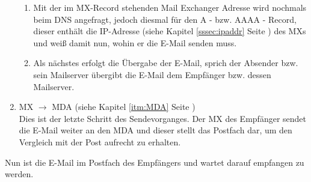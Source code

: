 \documentclass[12pt,a4paper]{report}
\begin{document}
\begin{onehalfspace}
\begin{enumerate}
\begin{enumerate}
\item Mit der im MX-Record stehenden Mail Exchanger Adresse wird nochmals beim DNS angefragt, jedoch diesmal für den A - bzw. AAAA - Record, dieser enthält die IP-Adresse (siehe Kapitel \ref{sssec:ipaddr} Seite \pageref{sssec:ipaddr}) des MXs und weiß damit nun, wohin er die E-Mail senden muss.
\item Als nächstes erfolgt die Übergabe der E-Mail, sprich der Absender bzw. sein Mailserver übergibt die E-Mail dem Empfänger bzw. dessen Mailserver. 
\end{enumerate}
\item MX $\rightarrow$ MDA (siehe Kapitel \ref{itm:MDA} Seite \pageref{itm:MDA})\\
Dies ist der letzte Schritt des Sendevorganges. Der MX des Empfänger sendet die E-Mail weiter an den MDA und dieser stellt das Postfach dar, um den Vergleich mit der Post aufrecht zu erhalten.
\end{enumerate}
Nun ist die E-Mail im Postfach des Empfängers und wartet darauf empfangen zu werden.

\end{onehalfspace}
\end{document}
